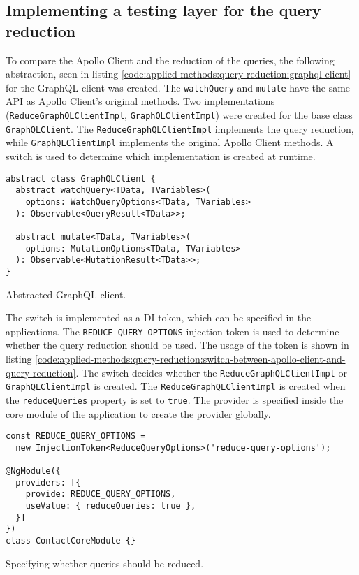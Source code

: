 \subsection{Implementing a testing layer for the query reduction}\label{subsection:applied-methods:query-reduction:testing-query-reduction}

To compare the Apollo Client and the reduction of the queries, the following abstraction, seen in listing \ref{code:applied-methods:query-reduction:graphql-client} for the GraphQL client was created. The \texttt{watchQuery} and \texttt{mutate} have the same \ac{API} as Apollo Client's original methods. Two implementations (\texttt{ReduceGraphQLClientImpl}, \texttt{GraphQLClientImpl}) were created for the base class \texttt{GraphQLClient}. The \texttt{ReduceGraphQLClientImpl} implements the query reduction, while \texttt{GraphQLClientImpl} implements the original Apollo Client methods. A switch is used to determine which implementation is created at runtime.

\ifshowListings
\begin{listing}[H]
\begin{verbatim}
abstract class GraphQLClient {
  abstract watchQuery<TData, TVariables>(
    options: WatchQueryOptions<TData, TVariables>
  ): Observable<QueryResult<TData>>;

  abstract mutate<TData, TVariables>(
    options: MutationOptions<TData, TVariables>
  ): Observable<MutationResult<TData>>;
}
\end{verbatim}
\caption{Abstracted GraphQL client.}\label{code:applied-methods:query-reduction:graphql-client}
\end{listing}
\fi

\noindent The switch is implemented as a \ac{DI} token, which can be specified in the applications. The \texttt{REDUCE\_QUERY\_OPTIONS} injection token is used to determine whether the query reduction should be used. The usage of the token is shown in listing \ref{code:applied-methods:query-reduction:switch-between-apollo-client-and-query-reduction}. The switch decides whether the \texttt{ReduceGraphQLClientImpl} or \texttt{GraphQLClientImpl} is created. The \texttt{ReduceGraphQLClientImpl} is created when the \texttt{reduceQueries} property is set to \texttt{true}. The provider is specified inside the core module of the application to create the provider globally.

\ifshowListings
\begin{listing}[H]
\begin{verbatim}
const REDUCE_QUERY_OPTIONS = 
  new InjectionToken<ReduceQueryOptions>('reduce-query-options');

@NgModule({
  providers: [{
    provide: REDUCE_QUERY_OPTIONS,
    useValue: { reduceQueries: true },
  }]
})
class ContactCoreModule {}
\end{verbatim}
\caption{Specifying whether queries should be reduced.}\label{code:applied-methods:query-reduction:switch-between-apollo-client-and-query-reduction}
\end{listing}
\fi

